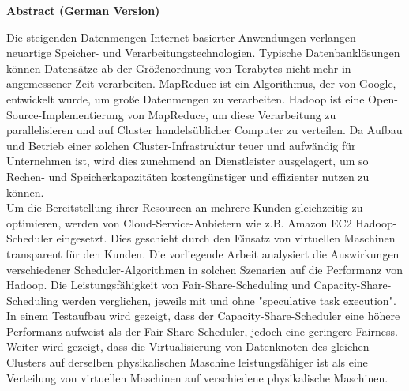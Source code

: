 \documentclass[11pt, a4paper, oneside]{Thesis} %
\begin{document}
\begin{center}
\textbf{Abstract (German Version)}
\end{center}


Die steigenden Datenmengen Internet-basierter Anwendungen verlangen
neuartige Speicher- und Verarbeitungstechnologien. Typische
Datenbanklösungen können Datensätze ab der Größenordnung von Terabytes
nicht mehr in angemessener Zeit verarbeiten. MapReduce ist ein
Algorithmus, der von Google, entwickelt wurde, um große Datenmengen zu
verarbeiten. Hadoop ist eine Open-Source-Implementierung von MapReduce,
um diese Verarbeitung zu parallelisieren und auf Cluster handelsüblicher
Computer zu verteilen. Da Aufbau und Betrieb einer solchen
Cluster-Infrastruktur teuer und aufwändig für Unternehmen ist, wird dies
zunehmend an Dienstleister ausgelagert, um so Rechen- und
Speicherkapazitäten kostengünstiger und effizienter nutzen zu können.\\

Um die Bereitstellung ihrer Resourcen an mehrere Kunden gleichzeitig zu
optimieren, werden von Cloud-Service-Anbietern wie z.B. Amazon EC2
Hadoop-Scheduler eingesetzt. Dies geschieht durch den Einsatz von
virtuellen Maschinen transparent für den Kunden. Die vorliegende Arbeit
analysiert die Auswirkungen verschiedener Scheduler-Algorithmen in
solchen Szenarien auf die Performanz von Hadoop. Die Leistungsfähigkeit
von Fair-Share-Scheduling und Capacity-Share-Scheduling werden
verglichen, jeweils mit und ohne "speculative task execution".\\

In einem Testaufbau wird gezeigt, dass der Capacity-Share-Scheduler eine
höhere Performanz aufweist als der Fair-Share-Scheduler, jedoch eine
geringere Fairness. Weiter wird gezeigt, dass die Virtualisierung von
Datenknoten des gleichen Clusters auf derselben physikalischen Maschine
leistungsfähiger ist als eine Verteilung von virtuellen Maschinen auf
verschiedene physikalische Maschinen.\\

\clearpage %


\end{document}
